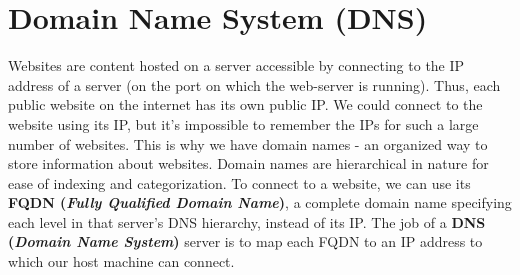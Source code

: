 \section{Domain Name System (DNS)}
Websites are content hosted on a server accessible by connecting to the IP address of a server (on the port on which the web-server is running). Thus, each public website on the internet has its own public IP. We could connect to the website using its IP, but it's impossible to remember the IPs for such a large number of websites. This is why we have domain names - an organized way to store information about websites. Domain names are hierarchical in nature for ease of indexing and categorization. To connect to a website, we can use its \textbf{FQDN (\textit{Fully Qualified Domain Name})}, a complete domain name specifying each level in that server's DNS hierarchy, instead of its IP. The job of a \textbf{DNS (\textit{Domain Name System})} server is to map each FQDN to an IP address to which our host machine can connect.